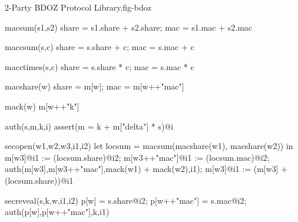 \begin{fpfig}[t]{2-Party BDOZ Protocol Library.}{fig-bdoz}
{\footnotesize
  \begin{verbatimtab}
    macsum(s1,s2)
    { { share = s1.share + s2.share; mac = s1.mac + s2.mac } }
    
    maccsum(s,c)
    { { share = s.share + c; mac = s.mac + c } }
    
    macctimes(s,c)
    { { share = s.share * c; mac = s.mac * c } }
    
    macshare(w) { {  share = m[w]; mac = m[w++"mac"] } }

    mack(w) { m[w++"k"] }
    
    auth(s,m,k,i) { assert(m = k + m["delta"] * s)@i }
    
    secopen(w1,w2,w3,i1,i2)
    {
      let locsum =  macsum(macshare(w1), macshare(w2)) in
      m[w3]@i1 := (locsum.share)@i2;
      m[w3++"mac"]@i1 := (locsum.mac)@i2;
      auth(m[w3],m[w3++"mac"],mack(w1) + mack(w2),i1);
      m[w3]@i1 := (m[w3] + (locsum.share))@i1
    }

    secreveal(s,k,w,i1,i2)
    {
      p[w] = s.share@i2;
      p[w++"mac"] = s.mac@i2;
      auth(p[w],p[w++"mac"],k,i1)    
    }
  \end{verbatimtab}
}
\end{fpfig}


    
